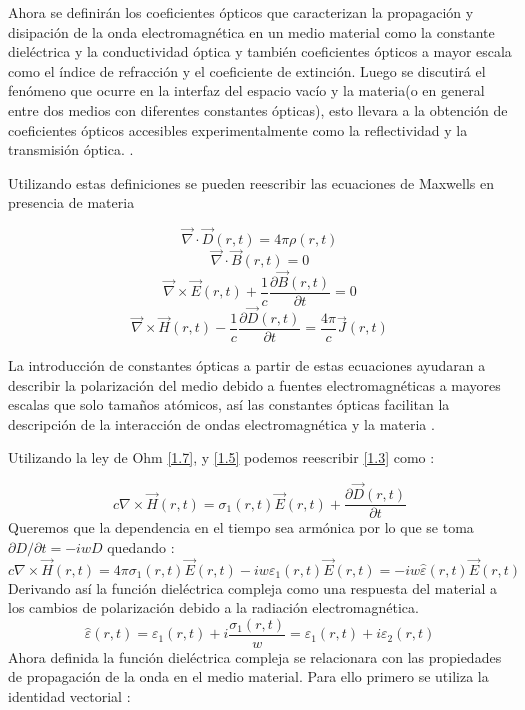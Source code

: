 \documentclass[a4paper,openright,12pt]{book}
\begin{document}
Ahora se definirán los coeficientes ópticos que caracterizan la propagación y disipación de la onda electromagnética en un medio material como la constante dieléctrica y la conductividad óptica y también coeficientes ópticos a mayor escala como el índice de refracción y el coeficiente de extinción. Luego se discutirá el fenómeno que ocurre en la interfaz del espacio vacío y la materia(o en general entre dos medios con diferentes constantes ópticas), esto llevara a la obtención de coeficientes ópticos accesibles experimentalmente como la reflectividad y la transmisión óptica. \cite{electrodynamics}.


Utilizando estas definiciones se pueden reescribir las ecuaciones de Maxwells en presencia de materia \cite{OpticalTechniques}

\begin{equation}\label{1.4}
\vec{\nabla}\cdot \vec{D}(r,t)=4\pi\rho(r,t)
\end{equation}
\begin{equation}\label{1.2}
\vec{\nabla}\cdot \vec{B}(r,t)=0
\end{equation}
\begin{equation}\label{1.1}
\vec{\nabla}\times \vec{E}(r,t)+ \frac{1}{c}\frac{\partial \vec{B}(r,t)}{\partial t}=0
\end{equation}
\begin{equation}\label{1.3}
\vec{\nabla}\times \vec{H}(r,t)-\frac{1}{c}\frac{\partial \vec{D}(r,t)}{\partial t}=\frac{4\pi}{c}\vec{J}(r,t)
\end{equation}

La introducción de constantes ópticas a partir de estas ecuaciones ayudaran a describir la polarización del medio debido a fuentes electromagnéticas a mayores escalas que solo tamaños atómicos, así las constantes ópticas facilitan la descripción de la interacción de ondas electromagnética y la materia \cite{OpticalTechniques}.

Utilizando  la ley de Ohm \ref{1.7}, y \ref{1.5} podemos reescribir \ref{1.3} como \cite{electrodynamics}:

\begin{equation}\label{1.8}
c\nabla\times \vec{H}(r,t)=\sigma_{1}(r,t) \vec{E}(r,t)+\frac{\partial \vec{D} (r,t)}{\partial t} 
\end{equation}
Queremos que la dependencia en el tiempo sea armónica por lo que se toma $\partial D/\partial t= -iw D$ quedando \cite{electrodynamics}:
\begin{equation}\label{1.9}
c\nabla\times \vec{H}(r,t)=4\pi \sigma_{1}(r,t) \vec{E}(r,t)-iw\varepsilon_{1}(r,t) \vec{E}(r,t) =-iw\hat{\varepsilon}(r,t) \vec{E}(r,t)
\end{equation}
Derivando así la función dieléctrica compleja   como una respuesta del material a los cambios de polarización debido a la radiación electromagnética.
\begin{equation}\label{1.10}
\hat{\varepsilon}(r,t)=\varepsilon_{1}(r,t)+i\frac{\sigma_{1}(r,t)}{w}=\varepsilon_{1}(r,t)+i\varepsilon_{2}(r,t)
\end{equation}
Ahora definida la función dieléctrica compleja se relacionara con las propiedades de propagación de la onda en el medio material. Para ello primero se utiliza la identidad vectorial \cite{OpticalTechniques} :
\end{document}
